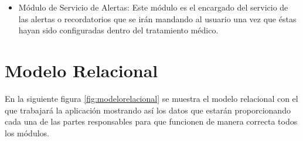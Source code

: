 \begin{itemize}
	\item Módulo de Servicio de Alertas: Este módulo es el encargado del servicio de las alertas o recordatorios que se irán mandando al usuario una vez que éstas hayan sido configuradas dentro del tratamiento médico.
	
	
	
	
	
	
	
\end{itemize}
\newpage
\section{Modelo Relacional}
En la siguiente figura \ref{fig:modelorelacional} se muestra el modelo relacional con el que trabajará la aplicación mostrando así los datos que estarán proporcionando cada una de las partes responsables para que funcionen de manera correcta todos los módulos.

